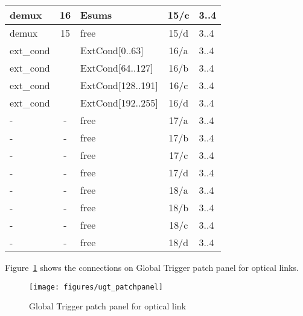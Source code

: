 \begin{longtable}{|l|c|l|c|l|}
demux & 16  & Esums      & 15/c & 3..4 \\\hline
demux & 15  & free      & 15/d & 3..4 \\\hline
ext\_cond &     & ExtCond[0..63]    & 16/a & 3..4 \\\hline
ext\_cond &     & ExtCond[64..127]  & 16/b & 3..4 \\\hline
ext\_cond &     & ExtCond[128..191] & 16/c & 3..4 \\\hline
ext\_cond &     & ExtCond[192..255] & 16/d & 3..4 \\\hline
- & - & free & 17/a & 3..4 \\\hline
- & - & free & 17/b & 3..4 \\\hline
- & - & free & 17/c & 3..4 \\\hline
- & - & free & 17/d & 3..4 \\\hline
- & - & free & 18/a & 3..4 \\\hline
- & - & free & 18/b & 3..4 \\\hline
- & - & free & 18/c & 3..4 \\\hline
- & - & free & 18/d & 3..4 \\\hline
\end{longtable}

Figure~\ref{fig:app:ugt_pp} shows the connections on Global Trigger patch panel for optical links.

\begin{figure}[htb]
\centering
\texttt{[image: figures/ugt\_patchpanel]}
\caption{Global Trigger patch panel for optical link}
\label{fig:app:ugt_pp}
\end{figure}

\clearpage
